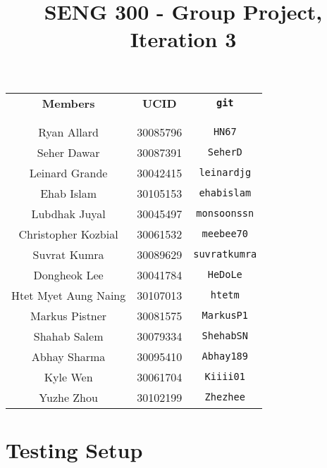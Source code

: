 \documentclass{article}
\begin{document}
    \title{SENG 300 - Group Project, Iteration 3}
    \date{}
    \author{}
    \maketitle

    \thispagestyle{empty}

    
    \begin{center}
    

    \begin{tabular}{c c c}
        \textbf{Members} & \textbf{UCID} & \textbf{\texttt{git}} \\
        \\\hline\\
        Ryan Allard & 30085796 & \texttt{HN67} \\
        Seher Dawar & 30087391 & \texttt{SeherD} \\
        Leinard Grande & 30042415 & \texttt{leinardjg} \\
        Ehab Islam & 30105153 & \texttt{ehabislam} \\
        Lubdhak Juyal & 30045497 & \texttt{monsoonssn} \\
        Christopher Kozbial & 30061532 & \texttt{meebee70} \\        
        Suvrat Kumra & 30089629 & \texttt{suvratkumra} \\
        Dongheok Lee & 30041784 & \texttt{HeDoLe} \\
        Htet Myet Aung Naing & 30107013 & \texttt{htetm} \\
        Markus Pistner & 30081575 & \texttt{MarkusP1} \\
        Shahab Salem & 30079334 & \texttt{ShehabSN} \\
        Abhay Sharma & 30095410 & \texttt{Abhay189} \\
        Kyle Wen & 30061704 & \texttt{Kiiii01} \\
        Yuzhe Zhou & 30102199 & \texttt{Zhezhee} \\
    \end{tabular}

    \end{center}

    \clearpage
    \section*{Testing Setup}
\end{document}
